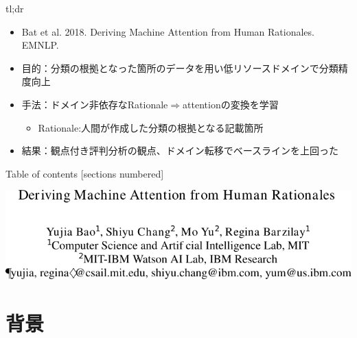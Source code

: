 \begin{frame}{tl;dr}
\begin{itemize}
\item Bat et al. 2018. Deriving Machine Attention from Human Rationales. EMNLP.
\item 目的：分類の根拠となった箇所のデータを用い低リソースドメインで分類精度向上
\item 手法：ドメイン非依存なRationale$\Rightarrow$attentionの変換を学習
\begin{itemize}
\item Rationale:人間が作成した分類の根拠となる記載箇所
\end{itemize}
\item 結果：観点付き評判分析の観点、ドメイン転移でベースラインを上回った
\end{itemize}
\end{frame}

\begin{frame}{Table of contents}
  [sections numbered]
  \tableofcontents[hideallsubsections]
\end{frame}

\begin{frame}[c]
  \begin{center}
    \includegraphics[width=\linewidth]{fig/title.pdf}    
  \end{center}
\end{frame}

\section{背景}
\frame[standout]{\insertsection}

